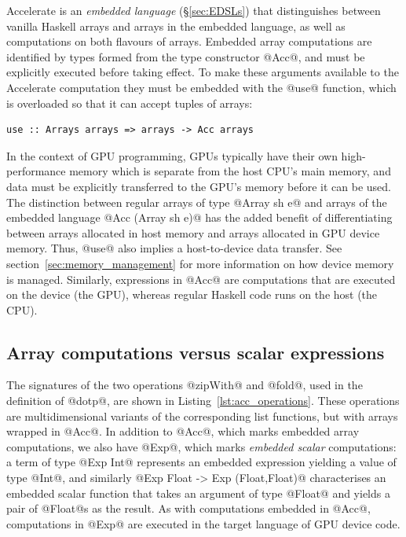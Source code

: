Accelerate is an \emph{embedded language} (\S\ref{sec:EDSLs}) that distinguishes
between vanilla Haskell arrays and arrays in the embedded language, as well as
computations on both flavours of arrays. Embedded array computations are
identified by types formed from the type constructor @Acc@, and must be
explicitly executed before taking effect. To make these arguments available to
the Accelerate computation they must be embedded with the @use@ function, which
is overloaded so that it can accept tuples of arrays:
%
\begin{lstlisting}[style=haskell]
use :: Arrays arrays => arrays -> Acc arrays
\end{lstlisting}
%
In the context of GPU programming, GPUs typically have their own
high-performance memory which is separate from the host CPU's main memory, and
data must be explicitly transferred to the GPU's memory before it can be used.
The distinction between regular arrays of type @Array sh e@ and arrays of the
embedded language @Acc (Array sh e)@ has the added benefit of differentiating
between arrays allocated in host memory and arrays allocated in GPU device
memory. Thus, @use@ also implies a host-to-device data transfer. See
section~\ref{sec:memory_management} for more information on how device memory is
managed. Similarly, expressions in @Acc@ are computations that are executed on
the device (the GPU), whereas regular Haskell code runs on the host (the CPU).


\subsection{Array computations versus scalar expressions}
\label{sec:array_computations_vs_scalar_expressions}

The signatures of the two operations @zipWith@ and @fold@, used in the
definition of @dotp@, are shown in Listing~\ref{lst:acc_operations}. These
operations are multidimensional variants of the corresponding list functions,
but with arrays wrapped in @Acc@. In addition to @Acc@, which marks embedded
array computations, we also have @Exp@, which marks \emph{embedded scalar}
computations: a term of type @Exp Int@ represents an embedded expression
yielding a value of type @Int@, and similarly @Exp Float -> Exp (Float,Float)@
characterises an embedded scalar function that takes an argument of type @Float@
and yields a pair of @Float@s as the result. As with computations embedded in
@Acc@, computations in @Exp@ are executed in the target language of GPU device
code.

